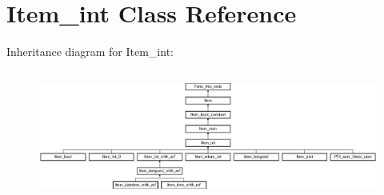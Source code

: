 \hypertarget{classItem__int}{}\section{Item\+\_\+int Class Reference}
\label{classItem__int}
Inheritance diagram for Item\+\_\+int\+:\begin{figure}[H]
\begin{center}
\leavevmode
\includegraphics[height=4.295302cm]{classItem__int}
\end{center}
\end{figure}
